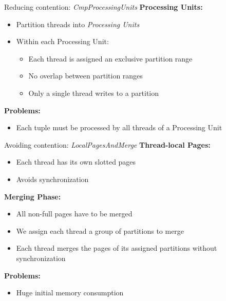 \begin{frame}{Reducing contention: \emph{CmpProcessingUnits}}
  \textbf{Processing Units:}
  \begin{itemize}
    \vspace{-1.5em}
    \item Partition threads into \emph{Processing Units}
    \item Within each Processing Unit:
          \begin{itemize}
            \item Each thread is assigned an exclusive partition range
            \item No overlap between partition ranges
            \item Only a single thread writes to a partition
          \end{itemize}
  \end{itemize}

  \textbf{Problems:}
  \begin{itemize}
    \vspace{-1.5em}
    \item Each tuple must be processed by all threads of a Processing Unit
  \end{itemize}
\end{frame}
\begin{frame}{Avoiding contention: \emph{LocalPagesAndMerge}}
  \textbf{Thread-local Pages:}
  \begin{itemize}
    \vspace{-1.5em}
    \item Each thread has its own slotted pages
    \item Avoids synchronization
  \end{itemize}
  \textbf{Merging Phase:}
  \begin{itemize}
    \vspace{-1.5em}
    \item All non-full pages have to be merged
    \item We assign each thread a group of partitions to merge
    \item Each thread merges the pages of its assigned partitions without synchronization
  \end{itemize}

  \textbf{Problems:}
  \begin{itemize}
    \vspace{-1.5em}
    \item Huge initial memory consumption
  \end{itemize}
\end{frame}
